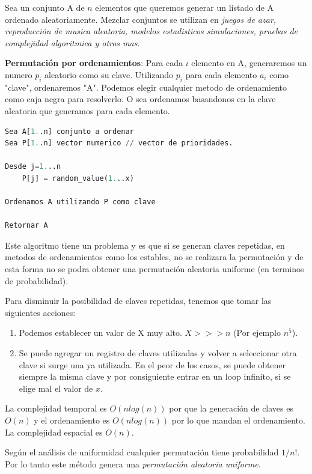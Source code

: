 \documentclass{article}
\begin{document}
Sea un conjunto A de \(n\) elementos que queremos generar un listado de A ordenado aleatoriamente.
Mezclar conjuntos se utilizan en \textit{juegos de azar, reproducción de musica aleatoria, modelos estadisticos 
simulaciones, pruebas de complejidad algoritmica y otros mas}.

\textbf{Permutación por ordenamientos}: 
Para cada \(i\) elemento en A, generaremos un numero \(p_i\) aleatorio como su clave.
Utilizando \(p_i\) para cada elemento \(a_i\) como "clave", ordenaremos "A". Podemos elegir 
cualquier metodo de ordenamiento como caja negra para resolverlo. O sea ordenamos basandonos
en la clave aleatoria que generamos para cada elemento.


\begin{lstlisting}[language=Python, caption=Algoritmo de permutación por odenamiento]
Sea A[1..n] conjunto a ordenar
Sea P[1..n] vector numerico // vector de prioridades.

Desde j=1...n
    P[j] = random_value(1...x)

Ordenamos A utilizando P como clave

Retornar A
\end{lstlisting}

Este algoritmo tiene un problema y es que si se generan claves repetidas, en metodos de 
ordenamientos como los estables, no se realizara la permutación y de esta forma no se podra 
obtener una permutación aleatoria uniforme (en terminos de probabilidad). 

Para disminuir la posibilidad de claves repetidas, tenemos que tomar las siguientes acciones:

\begin{enumerate}
    \item Podemos establecer un valor de X muy alto. \(X >>> n \) (Por ejemplo \(n^5\)).
    \item Se puede agregar un registro de claves utilizadas y volver a seleccionar otra clave 
            si surge una ya utilizada. En el peor de los casos, se puede obtener siempre la misma
            clave y por consiguiente entrar en un loop infinito, si se elige mal el valor de \(x\).
\end{enumerate}

La complejidad temporal es \(O(n log(n))\) por que la generación de claves es \(O(n)\) y el ordenamiento
es \(O(n log(n))\) por lo que mandan el ordenamiento. La complejidad espacial es \(O(n)\).

Según el análisis de uniformidad cualquier permutación tiene probabilidad \(1/n!\).
Por lo tanto este método genera una \textit{permutación aleatoria uniforme}.
\end{document}
